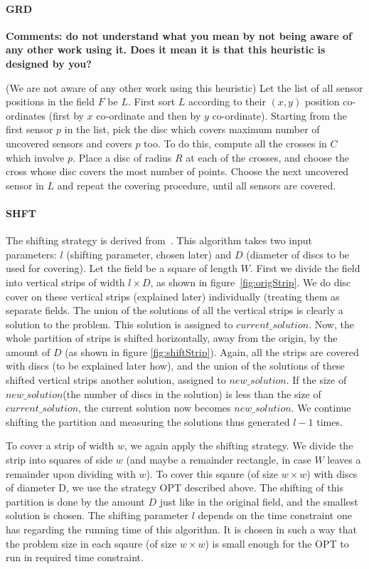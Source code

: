 \paragraph*{GRD} {\bf Comments: do not understand what you mean by not being aware of any other work using it. Does it mean it is that this heuristic
is designed by you?}

(We are not aware of any other work using this heuristic) Let the list of all sensor positions in the field $F$ be $L$. First sort $L$ according to their $(x,y)$ position co-ordinates (first by $x$ co-ordinate and then by $y$ co-ordinate). Starting from the first sensor $p$ in the list, pick the disc which covers maximum number of uncovered sensors and covers $p$ too. To do this, compute all the crosses in $C$ which involve $p$. Place a disc of radius $R$ at each of the crosses, and choose the cross whose disc covers the most number of points. Choose the next uncovered sensor in $L$ and repeat the covering procedure, until all sensors are covered.

\paragraph*{SHFT} 
The shifting strategy is derived from~\cite{shifting}. This algorithm takes two input parameters: $l$ (shifting parameter, chosen later) and $D$ (diameter of discs to be used for covering). Let the field be a square of length $W$. First we divide the field into vertical strips of width $l \times D$, as shown in figure~\ref{fig:origStrip}. We do disc cover on these vertical strips (explained later) individually (treating them as separate fields. The union of the solutions of all the vertical strips is clearly a solution to the problem. This solution is assigned to $current\_solution$. Now, the whole partition of strips is shifted horizontally, away from the origin, by the amount of $D$ (as shown in figure \ref{fig:shiftStrip}). Again, all the strips are covered with discs (to be explained later how), and the union of the solutions of these shifted vertical strips another solution, assigned to $new\_solution$. If the size of $new\_solution$(the number of discs in the solution) is less than the size of $current\_solution$, the current solution now becomes $new\_solution$. We continue shifting the partition and measuring the solutions thus generated $l-1$ times.

To cover a strip of width $w$, we again apply the shifting strategy. We divide the strip into squares of side $w$ (and maybe a remainder rectangle, in case $W$ leaves a remainder upon dividing with $w$). To cover this sqaure (of size $w \times w$) with discs of diameter D, we use the strategy OPT described above. The shifting of this partition is done by the amount $D$ just like in the original field, and the smallest solution is chosen. The shifting parameter $l$ depends on the time constraint one has regarding the running time of this algorithm. It is chosen in such a way that the problem size in each sqaure (of size $w \times w$) is small enough for the OPT to run in required time constraint.

